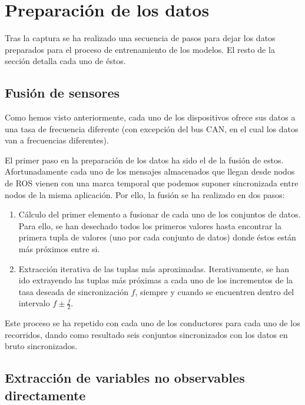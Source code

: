 
\section{Preparación de los datos}


Tras la captura se ha realizado una secuencia de pasos para dejar los datos preparados para el proceso de entrenamiento de los modelos. El resto de la sección detalla cada uno de éstos.

\subsection{Fusión de sensores}

Como hemos visto anteriormente, cada uno de los dispositivos ofrece sus datos a una tasa de frecuencia diferente (con excepción del bus CAN, en el cual los datos van a frecuencias diferentes).

El primer paso en la preparación de los datos ha sido el de la fusión de estos. Afortunadamente cada uno de los mensajes almacenados que llegan desde nodos de ROS vienen con una marca temporal que podemos suponer sincronizada entre nodos de la misma aplicación. Por ello, la fusión se ha realizado en dos pasos:

\begin{enumerate}
	\item Cálculo del primer elemento a fusionar de cada uno de los conjuntos de datos. Para ello, se han desechado todos los primeros valores hasta encontrar la primera tupla de valores (uno por cada conjunto de datos) donde éstos están más próximos entre si.
	\item Extracción iterativa de las tuplas más aproximadas. Iterativamente, se han ido extrayendo las tuplas más próximas a cada uno de los incrementos de la tasa deseada de sincronización $f$, siempre y cuando se encuentren dentro del intervalo $f \pm \frac{f}{2}$.
\end{enumerate}

Este proceso se ha repetido con cada uno de los conductores para cada uno de los recorridos, dando como resultado seis conjuntos sincronizados con los datos en bruto sincronizados.

\subsection{Extracción de variables no observables directamente}

